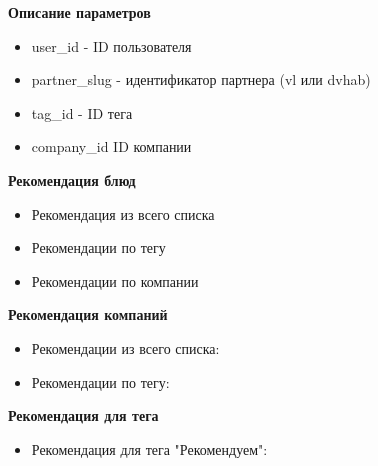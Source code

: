 \textbf{Описание параметров}
\begin{itemize}
  \item user\_id - ID пользователя
  \item partner\_slug - идентификатор партнера (vl или dvhab)
  \item tag\_id - ID тега
  \item company\_id ID компании
\end{itemize}

\textbf{Рекомендация блюд}

\begin{itemize}
  \item Рекомендация из всего списка


  \item Рекомендации по тегу


  \item Рекомендации по компании

\end{itemize}

\textbf{Рекомендация компаний}

\begin{itemize}
  \item Рекомендации из всего списка:


  \item Рекомендации по тегу:

\end{itemize}

\textbf{Рекомендация для тега}

\begin{itemize}
  \item Рекомендация для тега "Рекомендуем":

\end{itemize}
